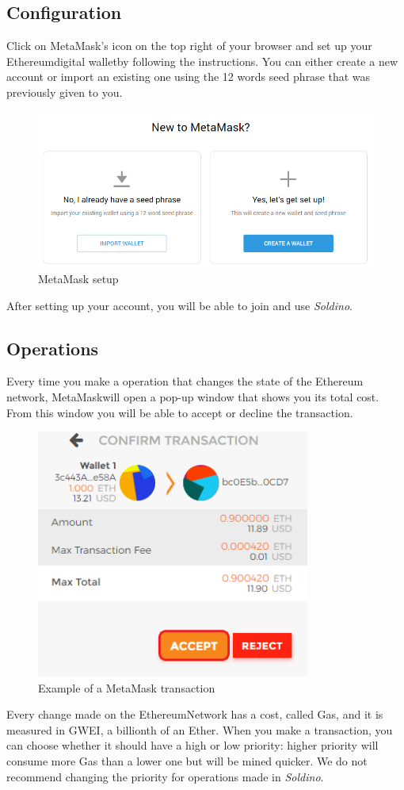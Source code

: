 	\subsection{Configuration}
	Click on MetaMask's icon on the top right of your browser and set up your 
	Ethereum\glosp digital wallet\glosp by following the instructions. You can either 
	create a new account or import an existing one using the 12 words seed phrase
	that was previously given to you.
	\begin{figure}[H]
		\includegraphics[width=15cm]{res/images/metamask_select.png}
		\centering
		\caption{MetaMask setup}
	\end{figure}
	\noindent After setting up your account, you will be able to join and use 
	\textit{Soldino}.
	\subsection{Operations}
	Every time you make a operation that changes the state of the Ethereum\glosp 
	network, MetaMask\glosp will open a pop-up window that shows you its total cost.
	From this window you will be able to accept or decline the transaction.\\
	\begin{figure}[H]
		\includegraphics[width=9cm]{res/images/metamask_transaction.png}
		\centering
		\caption{Example of a MetaMask transaction}
	\end{figure}
	\noindent 
	Every change made on the Ethereum\glosp Network has a cost, called 
	Gas\glo{}, and it is measured in GWEI, a billionth of an Ether\glo. When you 
	make a transaction, you can choose whether it should have a high or low 
	priority: higher priority will consume more Gas than a lower one but will 
	be mined quicker. We do not recommend changing the priority for 
	operations made in \textit{Soldino}.
